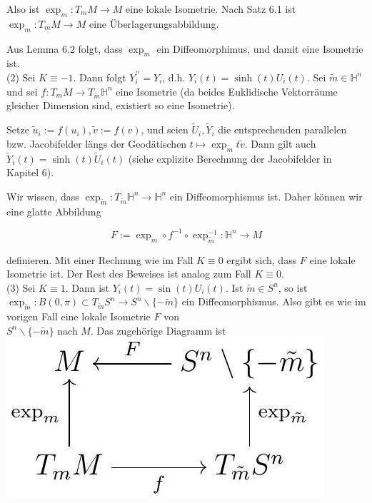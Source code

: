 \documentclass[10pt, letterpaper]{article}
\begin{document}
Also ist $\exp _{m}: T_{m} M \rightarrow M$ eine lokale Isometrie. Nach Satz 6.1 ist $\exp _{m}: T_{m} M \rightarrow M$ eine Überlagerungsabbildung.

Aus Lemma 6.2 folgt, dass $\exp _{m}$ ein Diffeomorphimus, und damit eine Isometrie ist.\\
(2) Sei $K \equiv-1$. Dann folgt $Y_{i}^{\prime \prime}=Y_{i}$, d.h. $Y_{i}(t)=\sinh (t) U_{i}(t)$. Sei $\tilde{m} \in \mathbb{H}^{n}$ und sei $f: T_{m} M \rightarrow T_{\tilde{m}} \mathbb{H}^{n}$ eine Isometrie (da beides Euklidische Vektorräume gleicher Dimension sind, existiert so eine Isometrie).

Setze $\tilde{u}_{i}:=f\left(u_{i}\right), \tilde{v}:=f(v)$, und seien $\tilde{U}_{i}, \tilde{Y}_{i}$ die entsprechenden parallelen bzw. Jacobifelder längs der Geodätischen $t \mapsto \exp _{\tilde{m}} t \tilde{v}$. Dann gilt auch $\tilde{Y}_{i}(t)=\sinh (t) \tilde{U}_{i}(t)$ (siehe explizite Berechnung der Jacobifelder in Kapitel 6).

Wir wissen, dass $\exp _{\tilde{m}}: T_{\tilde{m}} \mathbb{H}^{n} \rightarrow \mathbb{H}^{n}$ ein Diffeomorphismus ist. Daher können wir eine glatte Abbildung

$$
F:=\exp _{m} \circ f^{-1} \circ \exp _{\tilde{m}}^{-1}: \mathbb{H}^{n} \rightarrow M
$$

definieren. Mit einer Rechnung wie im Fall $K \equiv 0$ ergibt sich, dass $F$ eine lokale Isometrie ist. Der Rest des Beweises ist analog zum Fall $K \equiv 0$.\\
(3) Sei $K \equiv 1$. Dann ist $Y_{i}(t)=\sin (t) U_{i}(t)$. Ist $\tilde{m} \in S^{n}$, so ist $\exp _{\tilde{m}}: B(0, \pi) \subset T_{\tilde{m}} S^{n} \rightarrow S^{n} \backslash\{-\tilde{m}\}$ ein Diffeomorphismus. Also gibt es wie im vorigen Fall eine lokale Isometrie $F$ von\\
$S^{n} \backslash\{-\tilde{m}\}$ nach $M$. Das zugehörige Diagramm ist\\
\includegraphics[max width=\textwidth, center]{2025_05_20_3825c151ba0898b77b6eg-086}
\end{document}
